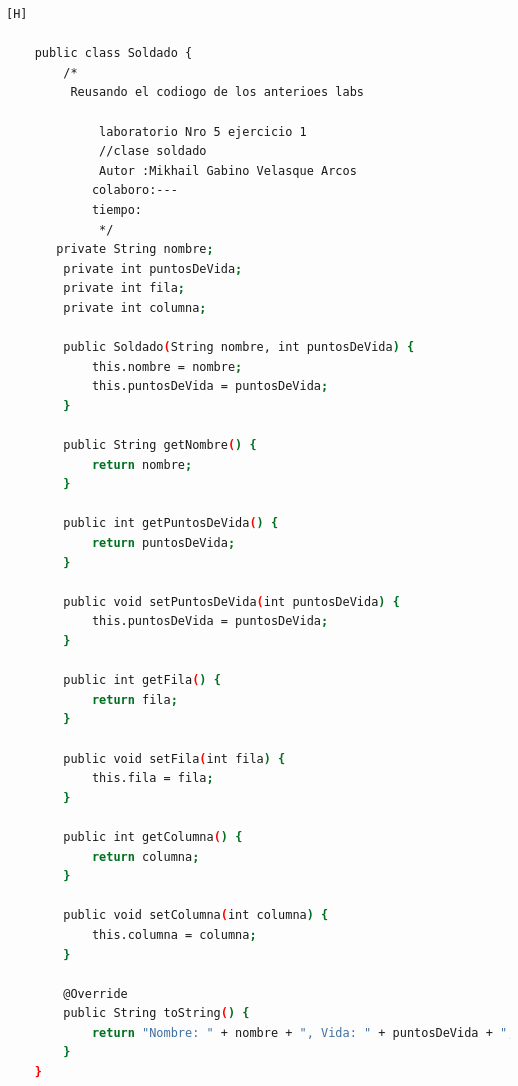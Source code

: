 \documentclass{article}
\begin{document}
	\begin{lstlisting}[language=bash,caption={Creando la clase soldado}][H]
			
	public class Soldado {
		/*
		 Reusando el codiogo de los anterioes labs
		
			 laboratorio Nro 5 ejercicio 1
			 //clase soldado
			 Autor :Mikhail Gabino Velasque Arcos
			colaboro:---
			tiempo:
			 */
	   private String nombre;
	    private int puntosDeVida;
	    private int fila;
	    private int columna;

	    public Soldado(String nombre, int puntosDeVida) {
	        this.nombre = nombre;
	        this.puntosDeVida = puntosDeVida;
	    }

	    public String getNombre() {
	        return nombre;
	    }

	    public int getPuntosDeVida() {
	        return puntosDeVida;
	    }

	    public void setPuntosDeVida(int puntosDeVida) {
	        this.puntosDeVida = puntosDeVida;
	    }

	    public int getFila() {
	        return fila;
	    }

	    public void setFila(int fila) {
	        this.fila = fila;
	    }

	    public int getColumna() {
	        return columna;
	    }

	    public void setColumna(int columna) {
	        this.columna = columna;
	    }

	    @Override
	    public String toString() {
	        return "Nombre: " + nombre + ", Vida: " + puntosDeVida + ", Fila: " + fila + ", Columna: " + columna;
	    }
	}		
			
			
			
			
			
	\end{lstlisting}	
\end{document}
